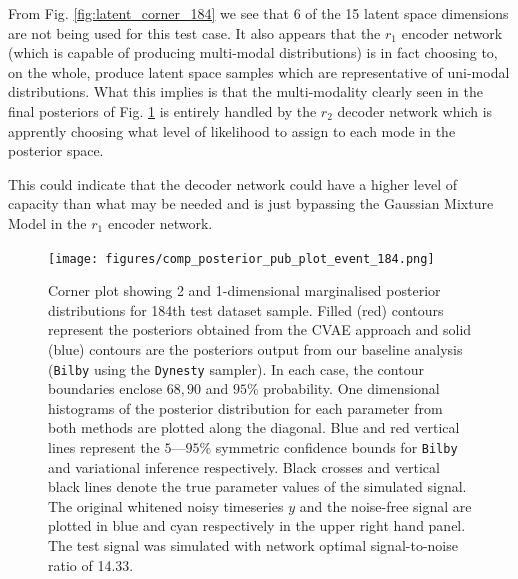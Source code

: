 From Fig. \ref{fig:latent_corner_184} we see that 6 of the 15 latent 
space dimensions are not being used for this test case. It also appears 
that the $r_1$ encoder network (which is capable of producing multi-modal 
distributions) is in fact choosing to, on the whole, produce latent space 
samples which are representative of uni-modal distributions. What this 
implies is that the multi-modality clearly seen in the final posteriors 
of Fig. \ref{fig:comp_post_184} is entirely handled by the $r_2$ decoder 
network which is apprently choosing what level of likelihood to 
assign to each mode in the posterior space. 

This could indicate that the decoder network could have a 
higher level of capacity than what may be needed and is just bypassing 
the Gaussian Mixture Model in the $r_1$ encoder network.

%
%
\begin{figure}
    \texttt{[image: figures/comp\_posterior\_pub\_plot\_event\_184.png]}
    \caption[Posterior predictions from \texttt{VItamin}, \texttt{Dynesty} and \texttt{Ptemcee} for the 184th test sample in the \texttt{VItamin} paper training set.]{\label{fig:comp_post_184} Corner plot showing 2 and 1-dimensional marginalised posterior distributions for 184th test dataset sample. Filled (red) contours represent the posteriors obtained from the \ac{CVAE} approach and solid (blue) contours are the posteriors output from our baseline analysis (\texttt{Bilby} using the \texttt{Dynesty} sampler). In each case, the contour boundaries enclose $68,90$ and $95\%$ probability. One dimensional histograms of the posterior distribution for each parameter from both methods are plotted along the diagonal. Blue and red vertical lines represent the $5$---$95\%$ symmetric confidence bounds for \texttt{Bilby} and variational inference respectively. Black crosses and vertical black lines denote the true parameter values of the simulated signal. The original whitened noisy timeseries $y$ and the noise-free signal are plotted in blue and cyan respectively in the upper right hand panel. The test signal was simulated with network optimal signal-to-noise ratio of 14.33.}
\end{figure}

